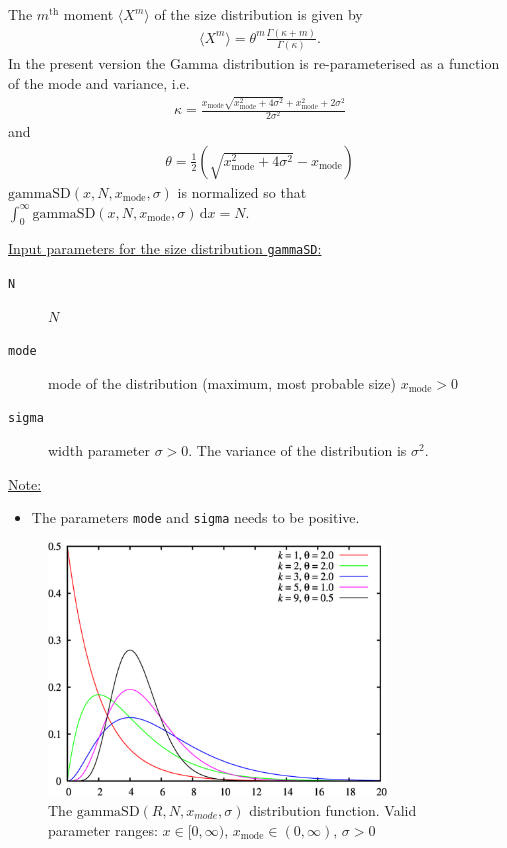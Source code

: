 The $m^\text{th}$ moment $\langle X^m\rangle$ of the size distribution is given by
\begin{align}
\langle X^m\rangle = \theta^m \frac{\Gamma(\kappa+m)}{\Gamma(\kappa)} .
\end{align}
In the present version the Gamma distribution is re-parameterised as a function
of the mode and variance, i.e.
\begin{align}
\kappa=\frac{x_\text{mode} \sqrt{x_\text{mode}^2+4
   \sigma^2}+x_\text{mode}^2+2 \sigma ^2}{2 \sigma^2}
\end{align}
 and
\begin{align}
 \theta = \frac{1}{2}
   \left(\sqrt{x_\text{mode}^2+4 \sigma ^2}-x_\text{mode}\right)
\end{align}
$\text{gammaSD}(x,N,x_\mathrm{mode},\sigma)$ is normalized so that
$\int_0^\infty\! \text{gammaSD}(x,N,x_\mathrm{mode},\sigma)\,\mathrm{d}x = N$.

\vspace{5mm}
\noindent \uline{Input parameters for the size distribution \texttt{gammaSD}:}
\begin{description}
\item[\texttt{N}]  $N$
\item[\texttt{mode}] mode of the distribution (maximum, most probable size) $x_\mathrm{mode}>0$
\item[\texttt{sigma}] width parameter $\sigma>0$. The variance of the distribution is $\sigma^2$.
\end{description}

\noindent\uline{Note:}
\begin{itemize}
\item The parameters \texttt{mode} and \texttt{sigma} needs to be positive.
\end{itemize}

\begin{figure}[htb]
\begin{center}
\includegraphics[width=0.8\textwidth]{Gamma_distribution_pdf.png}
\end{center}
\caption{The $\text{gammaSD}(R,N,x_{mode},\sigma)$ distribution
function.
Valid parameter ranges:
$x\in [0,\infty)$,
$x_\text{mode} \in (0,\infty)$,
$\sigma > 0$}
\label{GammaSD}
\end{figure}

